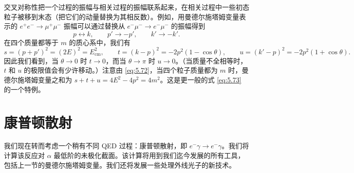 交叉对称性把一个过程的振幅与相关过程的振幅联系起来，在相关过程中一些初态粒子被移到末态（把它们的动量替换为其相反数）。例如，用曼德尔施塔姆变量表示的 $e^{+}e^{-}\to\mu^{+}\mu^{-}$ 振幅可以通过替换从 $e^{-}\mu^{-}\to e^{-}\mu^{-}$ 的振幅得到
\begin{equation}
  p \leftrightarrow k,\qquad p' \to -p',\qquad k' \to -k' .
  \label{eq:5.68}
\end{equation}
在四个质量都等于 $m$ 的质心系中，我们有
\begin{equation}
  s = (p+p')^2 = (2E)^2 = E^2_{\mathrm{cm}},\qquad
  t = (k-p)^2 = -2p^2(1-\cos\theta),\qquad
  u = (k'-p)^2 = -2p^2(1+\cos\theta) .
  \label{eq:5.72}
\end{equation}
因此我们看到，当 $\theta\to 0$ 时 $t\to 0$，而当 $\theta\to\pi$ 时 $u\to 0$。（当质量不全相等时，$t$ 和 $u$ 的极限值会有少许移动。）注意由 \eqref{eq:5.72}，当四个粒子质量都为 $m$ 时，曼德尔施塔姆变量之和为 $s+t+u = 4E^2 - 4p^2 = 4m^2$。这是更一般的式 \eqref{eq:5.73} 的一个特例。

\section{康普顿散射}

我们现在转而考虑一个稍有不同 QED 过程：康普顿散射，即 $e^{-}\gamma\to e^{-}\gamma$。我们将计算该反应对 $\alpha$ 最低阶的未极化截面。该计算将用到我们迄今发展的所有工具，包括上一节的曼德尔施塔姆变量。我们还将发展一些处理外线光子的新技术。

